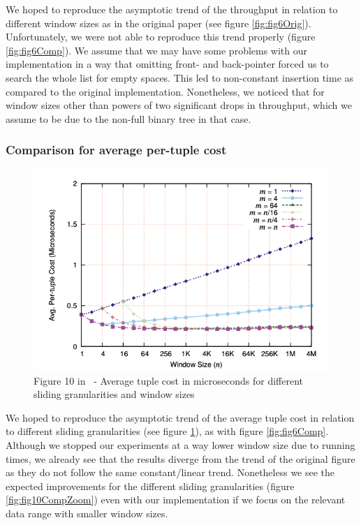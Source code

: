 We hoped to reproduce the asymptotic trend of the throughput in relation to different
window sizes as in the original paper (see figure \ref{fig:fig6Orig}).
Unfortunately, we were not able to reproduce this trend properly (figure \ref{fig:fig6Comp}).
We assume that we may have some problems with our implementation
in a way that omitting front- and back-pointer forced us to search the whole list for
empty spaces. This led to non-constant insertion time as compared to the original
implementation. Nonetheless, we noticed that for window sizes other than powers of
two significant drops in throughput, which we assume to be due to the non-full
binary tree in that case.

\subsubsection{Comparison for average per-tuple cost}



\begin{figure}[H]
	\centering
	\includegraphics[width=\linewidth]{../figures/fig10}
	\caption{Figure 10 in~\cite{GeneralIncremental15} -  Average tuple cost in microseconds for different sliding granularities and window sizes}
	\label{fig:fig10Orig}
\end{figure}

We hoped to reproduce the asymptotic trend of the average tuple cost in relation
to different sliding granularities (see figure \ref{fig:fig10Orig}), as with figure
\ref{fig:fig6Comp}. Although we stopped our experiments at a way lower window size
due to running times, we already see that the results diverge from the trend of
the original figure as they do not follow the same constant/linear trend.
Nonetheless we see the expected improvements for the different sliding granularities
(figure \ref{fig:fig10CompZoom}) even with our implementation if we focus on the
relevant data range with smaller window sizes.

